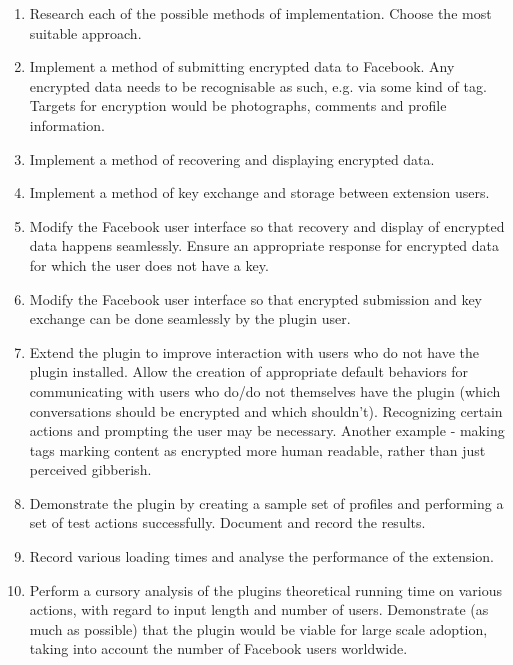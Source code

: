 \begin{enumerate}

\item Research each of the possible methods of implementation. Choose the most suitable approach.

\item Implement a method of submitting encrypted data to Facebook. Any encrypted data needs to be recognisable as such, e.g. via some kind of tag. Targets for encryption would be photographs, comments and profile information.

\item Implement a method of recovering and displaying encrypted data.

\item Implement a method of key exchange and storage between extension users.

\item Modify the Facebook user interface so that recovery and display of encrypted data happens seamlessly. Ensure an appropriate response for encrypted data for which the user does not have a key.

\item Modify the Facebook user interface so that encrypted submission and key exchange can be done seamlessly by the plugin user.

\item Extend the plugin to improve interaction with users who do not have the plugin installed. Allow the creation of appropriate default behaviors for communicating with users who do/do not themselves have the plugin (which conversations should be encrypted and which shouldn't). Recognizing certain actions and prompting the user may be necessary. Another example - making tags marking content as encrypted more human readable, rather than just perceived gibberish.

\item Demonstrate the plugin by creating a sample set of profiles and performing a set of test actions successfully. Document and record the results.

\item Record various loading times and analyse the performance of the extension.

\item Perform a cursory analysis of the plugins theoretical running time on various actions, with regard to input length and number of users. Demonstrate (as much as possible) that the plugin would be viable for large scale adoption, taking into account the number of Facebook users worldwide.


\end{enumerate}
